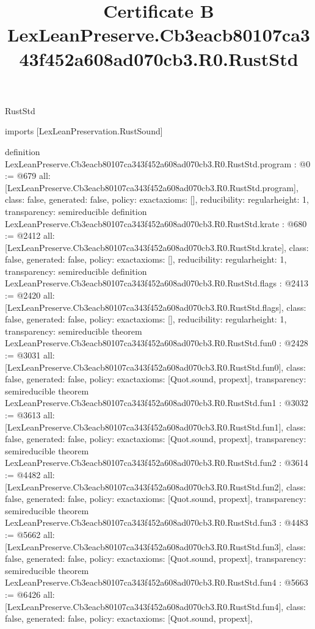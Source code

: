 \begin{lexlean}{RustStd}
\title{Certificate B LexLeanPreserve.Cb3eacb80107ca343f452a608ad070cb3.R0.RustStd}
\begin{coremodule}
imports [LexLeanPreservation.RustSound]

definition LexLeanPreserve.Cb3eacb80107ca343f452a608ad070cb3.R0.RustStd.program : @0 := @679 {
  all: [LexLeanPreserve.Cb3eacb80107ca343f452a608ad070cb3.R0.RustStd.program],
  class: false,
  generated: false,
  policy: exact{axioms: []},
  reducibility: regular{height: 1},
  transparency: semireducible
}
definition LexLeanPreserve.Cb3eacb80107ca343f452a608ad070cb3.R0.RustStd.krate : @680 := @2412 {
  all: [LexLeanPreserve.Cb3eacb80107ca343f452a608ad070cb3.R0.RustStd.krate],
  class: false,
  generated: false,
  policy: exact{axioms: []},
  reducibility: regular{height: 1},
  transparency: semireducible
}
definition LexLeanPreserve.Cb3eacb80107ca343f452a608ad070cb3.R0.RustStd.flags : @2413 := @2420 {
  all: [LexLeanPreserve.Cb3eacb80107ca343f452a608ad070cb3.R0.RustStd.flags],
  class: false,
  generated: false,
  policy: exact{axioms: []},
  reducibility: regular{height: 1},
  transparency: semireducible
}
theorem LexLeanPreserve.Cb3eacb80107ca343f452a608ad070cb3.R0.RustStd.fun0 : @2428 := @3031 {
  all: [LexLeanPreserve.Cb3eacb80107ca343f452a608ad070cb3.R0.RustStd.fun0],
  class: false,
  generated: false,
  policy: exact{axioms: [Quot.sound, propext]},
  transparency: semireducible
}
theorem LexLeanPreserve.Cb3eacb80107ca343f452a608ad070cb3.R0.RustStd.fun1 : @3032 := @3613 {
  all: [LexLeanPreserve.Cb3eacb80107ca343f452a608ad070cb3.R0.RustStd.fun1],
  class: false,
  generated: false,
  policy: exact{axioms: [Quot.sound, propext]},
  transparency: semireducible
}
theorem LexLeanPreserve.Cb3eacb80107ca343f452a608ad070cb3.R0.RustStd.fun2 : @3614 := @4482 {
  all: [LexLeanPreserve.Cb3eacb80107ca343f452a608ad070cb3.R0.RustStd.fun2],
  class: false,
  generated: false,
  policy: exact{axioms: [Quot.sound, propext]},
  transparency: semireducible
}
theorem LexLeanPreserve.Cb3eacb80107ca343f452a608ad070cb3.R0.RustStd.fun3 : @4483 := @5662 {
  all: [LexLeanPreserve.Cb3eacb80107ca343f452a608ad070cb3.R0.RustStd.fun3],
  class: false,
  generated: false,
  policy: exact{axioms: [Quot.sound, propext]},
  transparency: semireducible
}
theorem LexLeanPreserve.Cb3eacb80107ca343f452a608ad070cb3.R0.RustStd.fun4 : @5663 := @6426 {
  all: [LexLeanPreserve.Cb3eacb80107ca343f452a608ad070cb3.R0.RustStd.fun4],
  class: false,
  generated: false,
  policy: exact{axioms: [Quot.sound, propext]},
}
\end{coremodule}
\end{lexlean}
